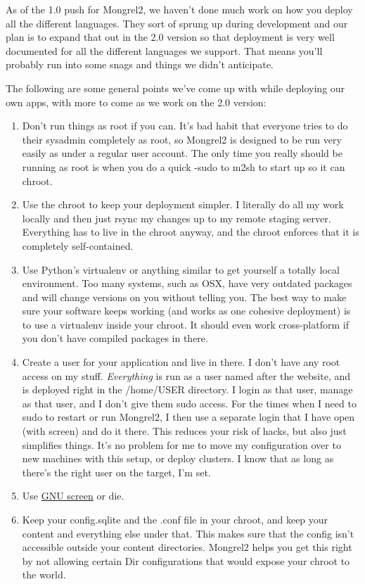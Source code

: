 As of the 1.0 push for Mongrel2, we haven't done much work on how you deploy all
the different languages.  They sort of sprung up during development and our plan is
to expand that out in the 2.0 version so that deployment is very well documented
for all the different languages we support.  That means you'll probably run into
some snags and things we didn't anticipate.

The following are some general points we've come up with while deploying our
own apps, with more to come as we work on the 2.0 version:

\begin{enumerate}
\item Don't run things as root if you can.  It's bad habit that everyone tries to
do their sysadmin completely as root, so Mongrel2 is designed to be run very easily
as under a regular user account.  The only time you really should be running as root
is when you do a quick -sudo to m2sh to start  up so it can chroot.

\item Use the chroot to keep your deployment simpler.  I literally do all my work
locally and then just rsync my changes up to my remote staging server.  Everything
has to live in the chroot anyway, and the chroot enforces that it is completely self-contained.

\item Use Python's virtualenv or anything similar to get yourself a totally local environment.
Too many systems, such as OSX, have very outdated packages and will change versions on you
without telling you.  The best way to make sure your software keeps working (and works as
one cohesive deployment) is to use a virtualenv inside your chroot.  It should even work
cross-platform if you don't have compiled packages in there.

\item Create a user for your application and live in there.  I don't have any root
access on my stuff.  \emph{Everything} is run as a user named after the website, and
is deployed right in the /home/USER directory.  I login as that user, manage as that user,
and I don't give them sudo access.  For the times when I need to sudo to restart or run
Mongrel2, I then use a separate login that I have open (with screen) and do it there.  This
reduces your risk of hacks, but also just simplifies things.  It's no problem for me to
move my configuration over to new machines with this setup, or deploy clusters.  I know that as
long as there's the right user on the target, I'm set.

\item Use \href{http://www.gnu.org/software/screen/}{GNU screen} or die.

\item Keep your config.sqlite and the .conf file in your chroot, and keep your content and
everything else under that.  This makes sure that the config isn't accessible outside your
content directories.  Mongrel2 helps you get this right by not allowing certain Dir
configurations that would expose your chroot to the world.
\end{enumerate}

